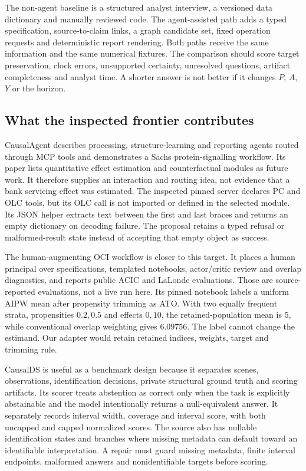 The non-agent baseline is a structured analyst interview, a versioned data dictionary and manually reviewed code. The agent-assisted path adds a typed specification, source-to-claim links, a graph candidate set, fixed operation requests and deterministic report rendering. Both paths receive the same information and the same numerical fixtures. The comparison should score target preservation, clock errors, unsupported certainty, unresolved questions, artifact completeness and analyst time. A shorter answer is not better if it changes $P$, $A$, $Y$ or the horizon.

\subsection{What the inspected frontier contributes}

CausalAgent describes processing, structure-learning and reporting agents routed through MCP tools and demonstrates a Sachs protein-signalling workflow. Its paper lists quantitative effect estimation and counterfactual modules as future work. It therefore supplies an interaction and routing idea, not evidence that a bank servicing effect was estimated. The inspected pinned server declares PC and OLC tools, but its OLC call is not imported or defined in the selected module. Its JSON helper extracts text between the first and last braces and returns an empty dictionary on decoding failure. The proposal retains a typed refusal or malformed-result state instead of accepting that empty object as success. \cite{exec13_data_causalagent,exec13_data_causalagent_code}

The human-augmenting OCI workflow is closer to this target. It places a human principal over specifications, templated notebooks, actor/critic review and overlap diagnostics, and reports public ACIC and LaLonde evaluations. Those are source-reported evaluations, not a live run here. Its pinned notebook labels a uniform AIPW mean after propensity trimming as ATO. With two equally frequent strata, propensities $0.2,0.5$ and effects $0,10$, the retained-population mean is $5$, while conventional overlap weighting gives $6.09756$. The label cannot change the estimand. Our adapter would retain retained indices, weights, target and trimming rule. \cite{exec13_data_oci,exec13_data_oci_code}

CausalDS is useful as a benchmark design because it separates scenes, observations, identification decisions, private structural ground truth and scoring artifacts. Its scorer treats abstention as correct only when the task is explicitly abstainable and the model intentionally returns a null-equivalent answer. It separately records interval width, coverage and interval score, with both uncapped and capped normalized scores. The source also has nullable identification states and branches where missing metadata can default toward an identifiable interpretation. A repair must guard missing metadata, finite interval endpoints, malformed answers and nonidentifiable targets before scoring. \cite{exec13_data_causalds,exec13_data_causalds_code}

